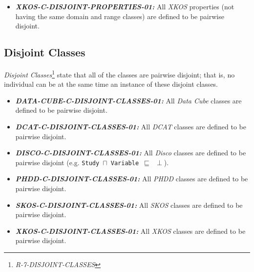 \documentclass{llncs}
\newcommand{\ms}[1]{\texttt{#1}}
\begin{document}
\begin{itemize}
	\item \textbf{{\em XKOS-C-DISJOINT-PROPERTIES-01:}} 
	All \emph{XKOS} properties (not having the same domain and range classes) are defined to be pairwise disjoint.
\end{itemize}

\subsection{Disjoint Classes}

{\em Disjoint Classes}\footnote{{\em R-7-DISJOINT-CLASSES}} state that all of the classes are pairwise disjoint; 
that is, no individual can be at the same time an instance of these disjoint classes.

\begin{itemize}
	\item \textbf{{\em DATA-CUBE-C-DISJOINT-CLASSES-01:}} 
All \emph{Data Cube} classes are defined to be pairwise disjoint.
\end{itemize}

\begin{itemize}
	\item \textbf{{\em DCAT-C-DISJOINT-CLASSES-01:}} 
All \emph{DCAT} classes are defined to be pairwise disjoint.
\end{itemize}

\begin{itemize}
	\item \textbf{{\em DISCO-C-DISJOINT-CLASSES-01:}} 
All \emph{Disco} classes are defined to be pairwise disjoint (e.g. \ms{Study $\sqcap$ Variable $\sqsubseteq$ $\perp$}).
\end{itemize}

\begin{itemize}
	\item \textbf{{\em PHDD-C-DISJOINT-CLASSES-01:}} 
All \emph{PHDD} classes are defined to be pairwise disjoint.
\end{itemize}

\begin{itemize}
	\item \textbf{{\em SKOS-C-DISJOINT-CLASSES-01:}} 
All \emph{SKOS} classes are defined to be pairwise disjoint.
\end{itemize}

\begin{itemize}
	\item \textbf{{\em XKOS-C-DISJOINT-CLASSES-01:}} 
All \emph{XKOS} classes are defined to be pairwise disjoint.
\end{itemize}
\end{document}
